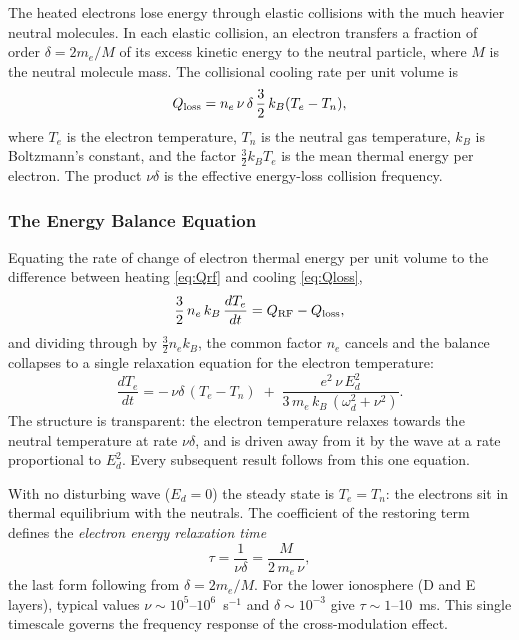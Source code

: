 \documentclass[12pt]{article}
\begin{document}
The heated electrons lose energy through elastic collisions with the much heavier neutral
molecules.  In each elastic collision, an electron transfers a fraction of order
$\delta = 2m_e/M$ of its excess kinetic energy to the neutral particle, where $M$ is the
neutral molecule mass.  The collisional cooling rate per unit volume is
\begin{equation}
  Q_{\rm loss} = n_e\,\nu\,\delta\,\frac{3}{2}\,k_B(T_e - T_n),
  \label{eq:Qloss}
\end{equation}
where $T_e$ is the electron temperature, $T_n$ is the neutral gas temperature, $k_B$ is
Boltzmann's constant, and the factor $\frac{3}{2}k_B T_e$ is the mean thermal energy per
electron.  The product $\nu\delta$ is the effective energy-loss collision frequency.

\subsubsection{The Energy Balance Equation}

Equating the rate of change of electron thermal energy per unit volume to the difference
between heating \eqref{eq:Qrf} and cooling \eqref{eq:Qloss},
\begin{equation}
  \frac{3}{2}\,n_e\,k_B\,\frac{dT_e}{dt} = Q_{\rm RF} - Q_{\rm loss},
  \label{eq:energy_balance}
\end{equation}
and dividing through by $\tfrac{3}{2}n_ek_B$, the common factor $n_e$ cancels and the
balance collapses to a single relaxation equation for the electron temperature:
\begin{equation}
  \boxed{
  \frac{dT_e}{dt} = -\,\nu\delta\,(T_e - T_n)
    \;+\; \frac{e^2\,\nu\,E_d^2}{3\,m_e\,k_B\,(\omega_d^2+\nu^2)}.
  }
  \label{eq:energy_simplified}
\end{equation}
The structure is transparent: the electron temperature relaxes towards the neutral
temperature at rate $\nu\delta$, and is driven away from it by the wave at a rate
proportional to $E_d^2$.  Every subsequent result follows from this one equation.

With no disturbing wave ($E_d = 0$) the steady state is $T_e = T_n$: the electrons sit in
thermal equilibrium with the neutrals.  The coefficient of the restoring term defines the
\emph{electron energy relaxation time}
\begin{equation}
  \tau = \frac{1}{\nu\delta} = \frac{M}{2\,m_e\,\nu},
  \label{eq:tau}
\end{equation}
the last form following from $\delta = 2m_e/M$.  For the lower ionosphere (D and E layers),
typical values $\nu \sim 10^5$--$10^6$~s$^{-1}$ and $\delta \sim 10^{-3}$ give
$\tau \sim 1$--10~ms.  This single timescale governs the frequency response of the
cross-modulation effect.
\end{document}
